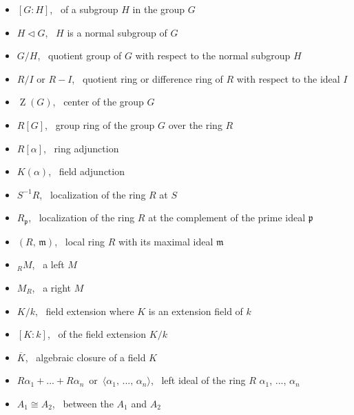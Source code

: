 \documentclass[12pt]{article}
\theoremstyle{definition}
\begin{document}
\begin{itemize}

\item $[G\!:\!H]$, \,  of a subgroup $H$ in the group $G$
\item $H \triangleleft G$, \, $H$ is a normal subgroup of $G$
\item $G/H$, \, quotient group of $G$ with respect to the normal subgroup $H$
\item $R/I$ or $R\!-\!I$, \, quotient ring or difference ring of $R$ with respect to the ideal $I$
\item $\operatorname{Z}(G)$, \, center of the group $G$
\item $R[G]$, \, group ring of the group $G$ over the ring $R$
\item $R[\alpha]$, \,  ring adjunction
\item $K(\alpha)$, \,  field adjunction
\item $S^{-1}R$, \, localization of the ring $R$ at $S$
\item $R_{\mathfrak{p}}$, \, localization of the ring $R$ at the complement of the prime ideal $\mathfrak{p}$
\item $(R,\,\mathfrak{m})$, \, local ring $R$ with its maximal ideal $\mathfrak{m}$
\item $_{R}M$, \, a left  $M$
\item $M_{R}$, \, a right  $M$
\item $K/k$, \, field extension where $K$ is an extension field of $k$
\item $[K\!:\!k]$, \,  of the field extension $K/k$
\item $\overline{K}$, \, algebraic closure of a field $K$
\item $R\alpha_1+...+R\alpha_n$ \,or\, $\langle \alpha_1,\,...,\,\alpha_n \rangle$, \, left ideal of the ring $R$  $\alpha_1$, ..., $\alpha_n$
\item $A_1 \cong A_2$, \,  between the  $A_1$ and $A_2$

\end{itemize}
\end{document}
